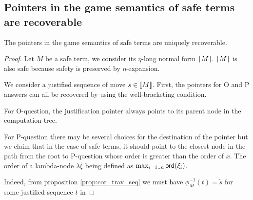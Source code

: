 
\subsection{Pointers in the game semantics of safe terms are recoverable}

\begin{prop}
The pointers in the game semantics of safe terms are
uniquely recoverable.
\end{prop}

\begin{proof}
Let $M$ be a safe term, we consider its $\eta$-long normal form $\lceil M\rceil$.
$\lceil M\rceil$ is also safe because safety is preserved by $\eta$-expansion.

We consider a justified sequence of move $s \in {[\![M ]\!]}$.
First, the pointers for O and P answers can all be recovered by using the well-bracketing condition.

For O-question, the justification pointer always points to its
parent node in the computation tree.

For P-question there may be several choices for the destination of
the pointer but we claim that in the case of safe terms, it should
point to the closest node in the path from the root to P-question
whose order is greater than the order of $x$. The order of a
lambda-node $\lambda \overline{\xi}$ being defined as $\max_{i=1..n}
{\sf ord}(\xi_i)$.

Indeed, from proposition \ref{prop:cor_trav_seq} we must have
$\phi^{-1}_{M}(t) = \tilde{s}$ for some justified sequence $t$ in 


\end{proof}
